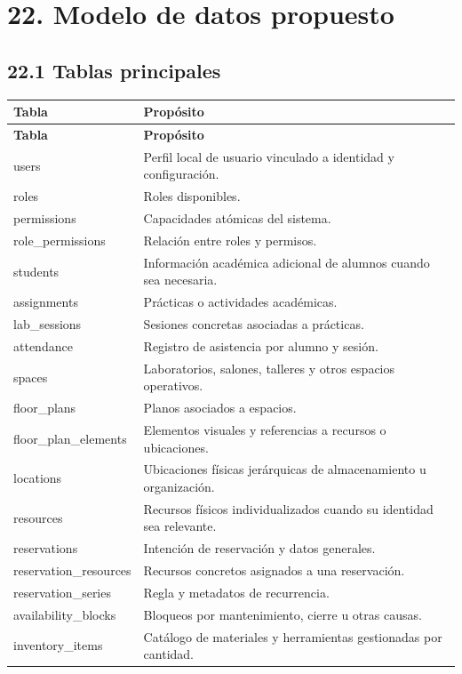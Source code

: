 \documentclass[12pt]{article}
\begin{document}
\section*{22. Modelo de datos propuesto}

\subsection*{22.1 Tablas principales}

\footnotesize
\begin{longtable}{p{4cm} p{9cm}}
\toprule
\textbf{Tabla} & \textbf{Propósito} \\
\midrule
\endfirsthead
\toprule
\textbf{Tabla} & \textbf{Propósito} \\
\midrule
\endhead
users & Perfil local de usuario vinculado a identidad y configuración. \\
roles & Roles disponibles. \\
permissions & Capacidades atómicas del sistema. \\
role\_permissions & Relación entre roles y permisos. \\
students & Información académica adicional de alumnos cuando sea necesaria. \\
assignments & Prácticas o actividades académicas. \\
lab\_sessions & Sesiones concretas asociadas a prácticas. \\
attendance & Registro de asistencia por alumno y sesión. \\
spaces & Laboratorios, salones, talleres y otros espacios operativos. \\
floor\_plans & Planos asociados a espacios. \\
floor\_plan\_elements & Elementos visuales y referencias a recursos o ubicaciones. \\
locations & Ubicaciones físicas jerárquicas de almacenamiento u organización. \\
resources & Recursos físicos individualizados cuando su identidad sea relevante. \\
reservations & Intención de reservación y datos generales. \\
reservation\_resources & Recursos concretos asignados a una reservación. \\
reservation\_series & Regla y metadatos de recurrencia. \\
availability\_blocks & Bloqueos por mantenimiento, cierre u otras causas. \\
inventory\_items & Catálogo de materiales y herramientas gestionadas por cantidad. \\

\end{longtable}
\end{document}
